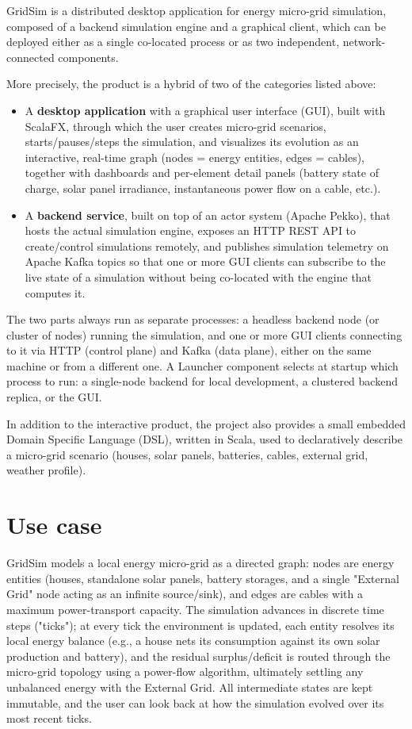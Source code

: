 \documentclass{scrreprt}
\begin{document}
GridSim is a distributed desktop application for energy micro-grid simulation, composed of
a backend simulation engine and a graphical client, which can be deployed either as a
single co-located process or as two independent, network-connected components.

More precisely, the product is a hybrid of two of the categories listed above:
\begin{itemize}
    \item A \textbf{desktop application} with a graphical user interface (GUI), built with ScalaFX,
  through which the user creates micro-grid scenarios, starts/pauses/steps the simulation,
  and visualizes its evolution as an interactive, real-time graph (nodes = energy entities,
  edges = cables), together with dashboards and per-element detail panels (battery state of
  charge, solar panel irradiance, instantaneous power flow on a cable, etc.).
  \item A \textbf{backend service}, built on top of an actor system (Apache Pekko), that
  hosts the actual simulation engine, exposes an HTTP REST API to create/control simulations
  remotely, and publishes simulation telemetry on Apache Kafka topics so that one or more GUI
  clients can subscribe to the live state of a simulation without being co-located with the
  engine that computes it.
\end{itemize}

The two parts always run as separate processes: a headless backend node (or cluster of
nodes) running the simulation, and one or more GUI clients connecting to it via HTTP (control
plane) and Kafka (data plane), either on the same machine or from a different one. A Launcher
component selects at startup which process to run: a single-node backend for local
development, a clustered backend replica, or the GUI.

In addition to the interactive product, the project also provides a small embedded Domain
Specific Language (DSL), written in Scala, used to declaratively describe a micro-grid
scenario (houses, solar panels, batteries, cables, external grid, weather profile).

\section{Use case}

GridSim models a local energy micro-grid as a directed graph: nodes are energy entities
(houses, standalone solar panels, battery storages, and a single "External Grid" node
acting as an infinite source/sink), and edges are cables with a maximum power-transport
capacity. The simulation advances in discrete time steps ("ticks"); at every tick the
environment is updated, each entity resolves
its local energy balance (e.g., a house nets its consumption against its own solar
production and battery), and the residual surplus/deficit is routed through the micro-grid
topology using a power-flow algorithm, ultimately settling any
unbalanced energy with the External Grid. All intermediate states are kept immutable, and
the user can look back at how the simulation evolved over its most recent ticks.
\end{document}
